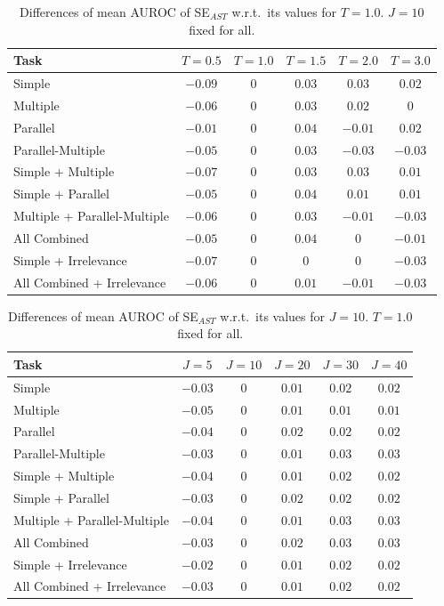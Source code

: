 \begin{table}[h!]
\centering
\caption{Differences of mean AUROC of SE$_{AST}$ w.r.t.\ its values for $T\!=\!1.0$. $J\!=\!10$ fixed for all.}
\label{tab:sensitivity_temperature}
\begin{tabular}{l|ccccc}
\toprule
\textbf{Task} & $T\!=\!0.5$ & $T\!=\!1.0$ & $T\!=\!1.5$ & $T\!=\!2.0$ & $T\!=\!3.0$ \\
\midrule
Simple & $-0.09$ & $0$ & $0.03$ & $0.03$ & $0.02$ \\
Multiple & $-0.06$ & $0$ & $0.03$ & $0.02$ & $0$ \\
Parallel & $-0.01$ & $0$ & $0.04$ & $-0.01$ & $0.02$ \\
Parallel-Multiple & $-0.05$ & $0$ & $0.03$ & $-0.03$ & $-0.03$ \\
Simple + Multiple & $-0.07$ & $0$ & $0.03$ & $0.03$ & $0.01$ \\
Simple + Parallel & $-0.05$ & $0$ & $0.04$ & $0.01$ & $0.01$ \\
Multiple + Parallel-Multiple & $-0.06$ & $0$ & $0.03$ & $-0.01$ & $-0.03$ \\
All Combined & $-0.05$ & $0$ & $0.04$ & $0$ & $-0.01$ \\
Simple + Irrelevance & $-0.07$ & $0$ & $0$ & $0$ & $-0.03$ \\
All Combined + Irrelevance & $-0.06$ & $0$ & $0.01$ & $-0.01$ & $-0.03$ \\
\bottomrule
\end{tabular}
\end{table}


\begin{table}[h!]
\centering
\caption{Differences of mean AUROC of SE$_{AST}$ w.r.t.\ its values for $J\!=\!10$. $T\!=\!1.0$ fixed for all.}
\label{tab:sensitivity_nsamples}
\begin{tabular}{l|ccccc}
\toprule
\textbf{Task} & $J\!=\!5$ & $J\!=\!10$ & $J\!=\!20$ & $J\!=\!30$ & $J\!=\!40$ \\
\midrule
Simple & $-0.03$ & $0$ & $0.01$ & $0.02$ & $0.02$ \\
Multiple & $-0.05$ & $0$ & $0.01$ & $0.01$ & $0.01$ \\
Parallel & $-0.04$ & $0$ & $0.02$ & $0.02$ & $0.02$ \\
Parallel-Multiple & $-0.03$ & $0$ & $0.01$ & $0.03$ & $0.03$ \\
Simple + Multiple & $-0.04$ & $0$ & $0.01$ & $0.02$ & $0.02$ \\
Simple + Parallel & $-0.03$ & $0$ & $0.02$ & $0.02$ & $0.02$ \\
Multiple + Parallel-Multiple & $-0.04$ & $0$ & $0.01$ & $0.03$ & $0.03$ \\
All Combined & $-0.03$ & $0$ & $0.02$ & $0.03$ & $0.03$ \\
Simple + Irrelevance & $-0.02$ & $0$ & $0.01$ & $0.02$ & $0.02$ \\
All Combined + Irrelevance & $-0.03$ & $0$ & $0.01$ & $0.02$ & $0.02$ \\
\bottomrule
\end{tabular}
\end{table}


